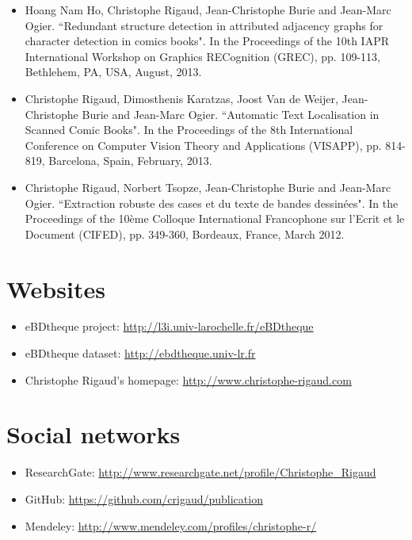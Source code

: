 \begin{itemize}
\item Hoang Nam Ho, Christophe Rigaud, Jean-Christophe Burie and Jean-Marc Ogier. ``Redundant structure detection in attributed adjacency graphs for character detection in comics books". In the Proceedings of the 10th IAPR International Workshop on Graphics RECognition (GREC), pp. 109-113, Bethlehem, PA, USA, August, 2013.
\vspace*{.3cm}

\item Christophe Rigaud, Dimosthenis Karatzas, Joost Van de Weijer, Jean-Christophe Burie and Jean-Marc Ogier. ``Automatic Text Localisation in Scanned Comic Books". In the Proceedings of the 8th International Conference on Computer Vision Theory and Applications (VISAPP), pp. 814-819, Barcelona, Spain, February, 2013.
\vspace*{.3cm}


\item Christophe Rigaud, Norbert Tsopze, Jean-Christophe Burie and Jean-Marc Ogier. ``Extraction robuste des cases et du texte de bandes dessin{\'e}es". In the Proceedings of the 10{\`e}me Colloque International Francophone sur l'Ecrit et le Document (CIFED), pp. 349-360, Bordeaux, France, March 2012.
\vspace*{.3cm}



\end{itemize}

\section*{Websites}

\begin{itemize}
	\item eBDtheque project: \url{http://l3i.univ-larochelle.fr/eBDtheque}
	\item eBDtheque dataset: \url{http://ebdtheque.univ-lr.fr}
	\item Christophe Rigaud's homepage: \url{http://www.christophe-rigaud.com}
\end{itemize}

\section*{Social networks}

\begin{itemize}
	\item ResearchGate: \url{http://www.researchgate.net/profile/Christophe_Rigaud}
	\item GitHub: \url{https://github.com/crigaud/publication}
	\item Mendeley: \url{http://www.mendeley.com/profiles/christophe-r/}
\end{itemize}
